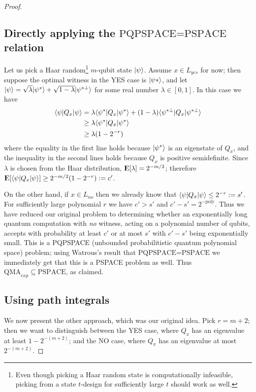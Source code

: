 \documentclass[english]{article}
\numberwithin{equation}{section}
\numberwithin{figure}{section}
\theoremstyle{plain}
\theoremstyle{definition}
\theoremstyle{plain}
\theoremstyle{definition}
\theoremstyle{remark}
\theoremstyle{remark}
\theoremstyle{plain}
\newcommand{\Expect}{{\rm I\kern-.3em E}}
\begin{document}
\begin{proof}
\subsection{Directly applying the $\text{PQPSPACE=PSPACE}$ relation}
Let us pick a Haar random\footnote{Even though picking a Haar random state is computationally infeasible, picking from a state $t$-design for sufficiently large $t$ should work as well.} $m$-qubit state $|\psi\rangle$. Assume $x \in L_{yes}$ for now; then suppose the optimal witness in the YES case is $|\psi*\rangle$, and let $|\psi\rangle = \sqrt{\lambda}|\psi^*\rangle + \sqrt{1-\lambda}|\psi^{*\perp}\rangle$ for some real number $\lambda \in [0,1]$. In this case we have
\begin{align}
\langle \psi|Q_x|\psi\rangle &= \lambda \langle \psi^*|Q_x|\psi^*\rangle + (1-\lambda) \langle \psi^{*\perp}|Q_x|\psi^{*\perp}\rangle \\ 
&\ge \lambda \langle \psi^*|Q_x|\psi^*\rangle \\
&\ge \lambda(1 - 2^{-r})
\end{align}
where the equality in the first line holds because $|\psi^*\rangle$ is an eigenstate of $Q_x$, and the inequality in the second lines holds because $Q_x$ is positive semidefinite. Since $\lambda$ is chosen from the Haar distribution, $\Expect [\lambda] = 2^{-m/2}$; therefore $\Expect [\bra{\psi}Q_x\ket{\psi}] \ge 2^{-m/2}(1-2^{-r}) := c'$.

On the other hand, if $x \in L_{no}$ then we already know that $\langle \psi|Q_x|\psi\rangle \le 2^{-r} := s'$. For sufficiently large polynomial $r$ we have $c' > s'$ and $c' - s' = 2^{-\text{poly}}$. Thus we have reduced our original problem to determining whether an exponentially long quantum computation with \emph{no} witness, acting on a polynomial number of qubits, accepts with probability at least $c'$ or at most $s'$ with $c' - s'$ being exponentially small. This is a PQPSPACE (unbounded probabilitistic quantum polynomial space) problem; using Watrous's result that $\text{PQPSPACE=PSPACE}$ we immediately get that this is a PSPACE problem as well. Thus $\text{QMA}_{exp} \subseteq \text{PSPACE}$, as claimed.

\subsection{Using path integrals}
We now present the other approach, which was our original idea. Pick $r = m+2$; then we want to distinguish between the YES case, where $Q_x$ has an eigenvalue at least $1-2^{-(m+2)}$; and the NO case, where $Q_x$ has an eigenvalue at most $2^{-(m+2)}$.


\end{proof}
\end{document}
